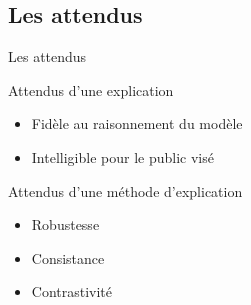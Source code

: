 \documentclass[french, 12pt, aspectratio=2013]{beamer}
\begin{document}
    \subsection{Les attendus}
        \begin{frame}{Les attendus}
            \begin{block}{Attendus d'une explication \cite{gilpin_explaining_2019}}
                \begin{itemize}
                    \item Fidèle au raisonnement du modèle
                    \item Intelligible pour le public visé
                \end{itemize}
            \end{block}
            
            \pause
            \begin{block}{Attendus d'une méthode d'explication \cite{mersha_evaluating_2025}}
                \begin{itemize}
                    \item Robustesse %
                    \item Consistance %
                    \item Contrastivité %
                \end{itemize}
            \end{block}

        \end{frame}
        
\end{document}
